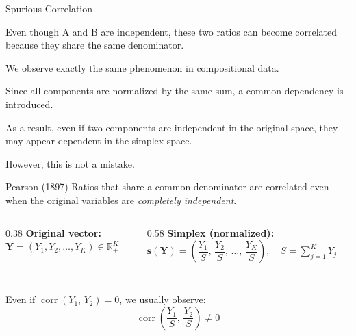 \begin{frame}{Spurious Correlation}
{{Even though A and B are independent, these two ratios can become correlated because they share the same denominator.

We observe exactly the same phenomenon in compositional data.

Since all components are normalized by the same sum, a common dependency is introduced.

As a result, even if two components are independent in the original space, they may appear dependent in the simplex space.

However, this is not a mistake.

}
  \begin{block}{Pearson (1897)}
    Ratios that share a common denominator are correlated even when the
    original variables are \emph{completely independent}.
  \end{block}

  \vspace{0.4em}

  \begin{columns}[t]
    \begin{column}{0.38\textwidth}
      \textbf{Original vector:}\\[4pt]
      $\mathbf{Y} = (Y_1, Y_2, \ldots, Y_K) \in \mathbb{R}_+^K$
    \end{column}
    \begin{column}{0.58\textwidth}
      \textbf{Simplex (normalized):}\\[4pt]
      $\mathbf{s}(\mathbf{Y}) = \!\left(\dfrac{Y_1}{S},\, \dfrac{Y_2}{S},\, \ldots,\, \dfrac{Y_K}{S}\right),
      \quad S = \sum_{j=1}^{K} Y_j$
    \end{column}
  \end{columns}

  \vspace{0.5em}
  \rule{\textwidth}{0.3pt}
  \vspace{0.3em}

  Even if $\operatorname{corr}(Y_1,\, Y_2) = 0$, we usually observe:
  \[
    \boxed{\operatorname{corr}\!\left(\frac{Y_1}{S},\,\frac{Y_2}{S}\right) \neq 0}
  \]
}

\end{frame}
